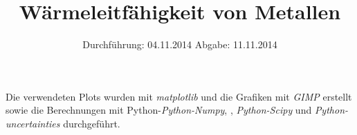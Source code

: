


\subject{Versuch 204}
\title{Wärmeleitfähigkeit von Metallen}
\date{
  Durchführung: 04.11.2014
  \hspace{3em}
  Abgabe: 11.11.2014
}




\maketitle
\thispagestyle{empty}
\newpage





\printbibliography
\noindent Die verwendeten Plots wurden mit \textit{matplotlib}\cite{matplotlib} und die Grafiken mit \textit{GIMP}\cite{gimp} erstellt sowie die Berechnungen mit Python-\textit{Python-Numpy}, \cite{numpy}, \textit{Python-Scipy}\cite{scipy} und \textit{Python-uncertainties}\cite{uncertainties} durchgeführt.

